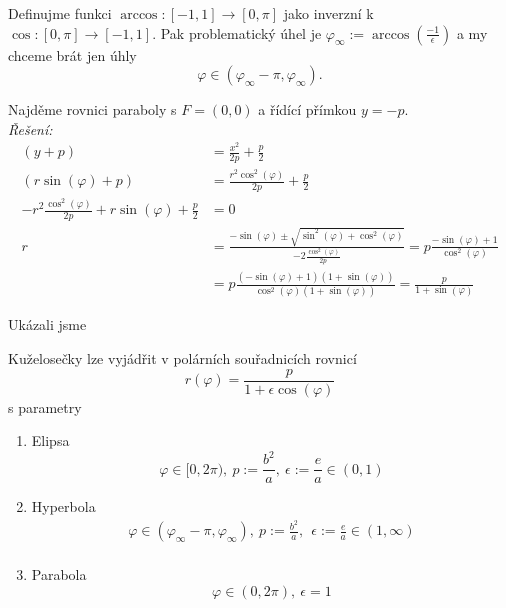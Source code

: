 Definujme funkci $\arccos\colon [-1,1]\to [0,\pi]$ jako inverzní k $\cos\colon [0,\pi]\to [-1,1].$ Pak problematický úhel je $\varphi_{\infty}:=\arccos(\frac{-1}{\epsilon})$ a my chceme brát jen úhly
\begin{equation*}
	\varphi\in (\varphi_{\infty}-\pi, \varphi_{\infty}).
\end{equation*}
\begin{příklad}
  Najděme rovnici paraboly s $F=(0,0)$ a řídící přímkou $y=-p.$\\
  \textit{Řešení:}
  \begin{align*}
        (y+p) &= \frac{x^{2}}{2p}+\frac{p}{2} \\
	(r\sin(\varphi)+p) &= \frac{r^{2}\cos^{2}(\varphi)}{2p}+\frac{p}{2} \\
	-r^{2}\frac{\cos^{2}(\varphi)}{2p}+r\sin(\varphi)+\frac{p}{2} &= 0 \\
	r &= \frac{-\sin(\varphi)\pm \sqrt{\sin^{2}(\varphi)+\cos^{2}(\varphi)}}{-2\frac{\cos^{2}(\varphi)}{2p}} = p\frac{-\sin(\varphi)+1}{\cos^{2}(\varphi)} \\
	  &=p \frac{(-\sin(\varphi)+1)(1+\sin(\varphi))}{\cos^{2}(\varphi)(1+\sin(\varphi))} =\frac{p}{1+\sin(\varphi)}
  \end{align*}
\end{příklad}

Ukázali jsme
\begin{věta}
  Kuželosečky lze vyjádřit v polárních souřadnicích rovnicí
  \begin{equation*}
    r(\varphi)=\frac{p}{1+\epsilon\cos(\varphi)}
  \end{equation*}
  s parametry
  \begin{enumerate}
	  \item Elipsa
		  \begin{equation*}
			  \varphi\in[0,2\pi),\ p:= \frac{b^{2}}{a},\ \epsilon:=\frac{e}{a}\in (0,1)
		  \end{equation*}
	  \item Hyperbola
		  \begin{align*}
			  \varphi\in(\varphi_\infty-\pi, \varphi_\infty),\ p:= \frac{b^{2}}{a},\ \ \epsilon:=\frac{e}{a}\in (1,\infty) \\
		  \end{align*}
	  \item Parabola
		  \begin{equation*}
			\varphi\in(0,2\pi),\ \epsilon=1
		  \end{equation*}
  \end{enumerate}
\end{věta}

